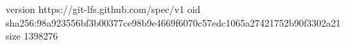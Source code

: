 version https://git-lfs.github.com/spec/v1
oid sha256:98a923556bf3b00377ce98b9e4669f6070c57edc1065a27421752b90f3302a21
size 1398276
